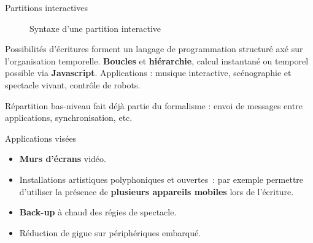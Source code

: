 \begin{block}{Partitions interactives}
\begin{figure}
\caption{Syntaxe d'une partition interactive}
\end{figure}
Possibilités d'écritures forment un langage de programmation structuré axé sur l'organisation temporelle. 
\textbf{Boucles} et \textbf{hiérarchie}, calcul instantané ou temporel possible via \textbf{Javascript}.
Applications : musique interactive, scénographie et spectacle vivant, contrôle de robots.

Répartition bas-niveau fait déjà partie du formalisme : envoi de messages entre applications, synchronisation, etc.
\end{block}
\begin{block}{Applications visées}
    \begin{itemize}
        \item \textbf{Murs d'écrans} vidéo.
        \item Installations artistiques polyphoniques et ouvertes~: 
        par exemple permettre d'utiliser la présence de \textbf{plusieurs appareils mobiles} 
        lors de l'écriture.
        \item \textbf{Back-up} à chaud des régies de spectacle.
        \item Réduction de gigue sur périphériques embarqué.
    \end{itemize}
\end{block}